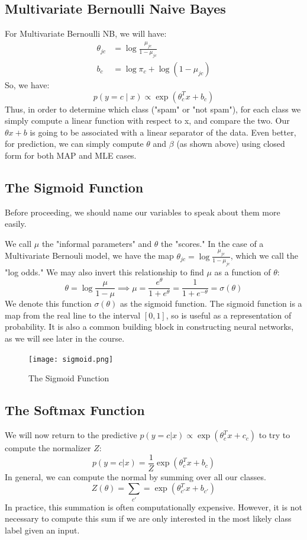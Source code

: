 \documentclass{article}
\begin{document}
\subsection{Multivariate Bernoulli Naive Bayes}
For Multivariate Bernoulli NB, we will have:
\begin{align*}
    \theta_{jc} &= \log \frac{\mu_{jc}}{1 - \mu_{jc}} \\
    b_c &= \log \pi_c + \log(1- \mu_{jc})
\end{align*}
So, we have:
$$ p(y=c \mid x) \propto \exp(\theta_c^T x + b_c) $$
Thus, in order to determine which class ("spam" or "not spam"), for each class we simply compute a linear function with respect to x, and compare the two. Our $\theta x + b$ is going to be associated with a linear separator of the data.  Even better, for prediction, we can simply compute $\theta$ and $\beta$ (as shown above) using closed form for both MAP and MLE cases.

\subsection{The Sigmoid Function}
Before proceeding, we should name our variables to speak about them more easily.

\smallskip

We call $\mu$ the "informal parameters" and $\theta$ the "scores." In the case of a Multivariate Bernouli model, we have the map $\theta_{jc} =  \log \frac{\mu_{jc}}{1-\mu_{jc}}$, which we call the "log odds."
We may also invert this relationship to find $\mu$ as a function of $\theta$: 
$$ \theta = \log \frac{\mu}{1-\mu} \implies \mu = \frac{e^{\theta}}{1 + e^{\theta}} = \frac{1}{1 + e^{-\theta}} = \sigma(\theta) $$
We denote this function $\sigma(\theta)$ as the sigmoid function. The sigmoid function is a map from the real line to the interval $[0,1]$, so is useful as a representation of probability. It is also a common building block in constructing neural networks, as we will see later in the course. 
\begin{figure}
\centering
\texttt{[image: sigmoid.png]}
\caption{The Sigmoid Function}
\end{figure}
\subsection{The Softmax Function}
We will now return to the predictive $p(y = c | x) \propto \exp(\theta_c^T x + c_c)$ to try to compute the normalizer $Z$: 
$$ p(y=c|x) = \frac{1}{Z} \exp(\theta_c^T x + b_c) $$
In general, we can compute the normal by summing over all our classes.
$$ Z(\theta) = \sum_{c'} = \exp(\theta_{c'}^T x + b_{c'}) $$
In practice, this summation is often computationally expensive. However, it is not necessary to compute this sum if we are only interested in the most likely class label given an input.
\end{document}
